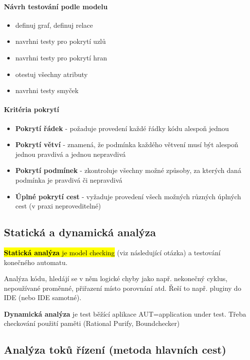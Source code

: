 \paragraph{Návrh testování podle modelu}
\begin{itemize}[itemsep=0px]
\item definuj graf, definuj relace
\item navrhni testy pro pokrytí uzlů
\item navrhni testy pro pokrytí hran
\item otestuj všechny atributy
\item navrhni testy smyček
\end{itemize}

\paragraph{Kritéria pokrytí}
\begin{itemize}[itemsep=0px]
\item \textbf{Pokrytí řádek} - požaduje provedení každé řádky kódu alespoň jednou
\item \textbf{Pokrytí větví} - znamená, že podmínka každého větvení musí být alespoň jednou pravdivá a jednou nepravdivá
\item \textbf{Pokrytí podmínek} - zkontroluje všechny možné způsoby, za kterých daná podmínka je pravdivá či nepravdivá
\item \textbf{Úplné pokrytí cest} - vyžaduje provedení všech možných různých úplných cest (v praxi neproveditelné)
\end{itemize}

\subsection{Statická a dynamická analýza}
\hl{\textbf{Statická analýza} je model checking} (viz následující otázka) a testování konečného automatu.

Analýza kódu, hledájí se v něm logické chyby jako např. nekonečný cyklus, nepoužívané proměnné, přiřazení místo porovnání atd. Řeší to např. pluginy do IDE (nebo IDE samotné).

\textbf{Dynamická analýza} je test běžící aplikace AUT=application under test. Třeba checkování použití paměti (Rational Purify, Boundchecker)

\subsection{Analýza toků řízení (metoda hlavních cest)}


